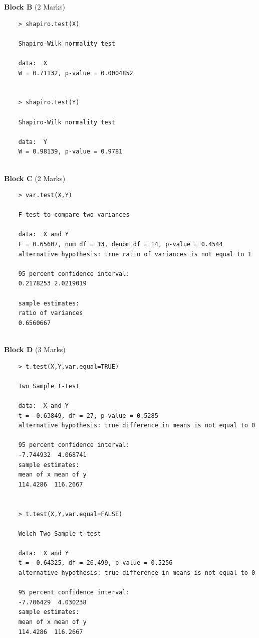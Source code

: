 \documentclass[a4paper,12pt]{article}
\begin{document}
\begin{framed}
	\noindent 	\textbf{Block B} (2 Marks)
	\begin{verbatim}
	> shapiro.test(X)
	
	Shapiro-Wilk normality test
	
	data:  X
	W = 0.71132, p-value = 0.0004852
	
	
	> shapiro.test(Y)
	
	Shapiro-Wilk normality test
	
	data:  Y
	W = 0.98139, p-value = 0.9781
	
	\end{verbatim}
\end{framed}

\begin{framed}
	\noindent 	\textbf{Block C} (2 Marks)
	\begin{verbatim}
	> var.test(X,Y)
	
	F test to compare two variances
	
	data:  X and Y
	F = 0.65607, num df = 13, denom df = 14, p-value = 0.4544
	alternative hypothesis: true ratio of variances is not equal to 1
	
	95 percent confidence interval:
	0.2178253 2.0219019
	
	sample estimates:
	ratio of variances 
	0.6560667
	
	\end{verbatim}
\end{framed}
\newpage
\begin{framed}
	\noindent \textbf{Block D} (3 Marks)
	\begin{verbatim}
	> t.test(X,Y,var.equal=TRUE)
	
	Two Sample t-test
	
	data:  X and Y
	t = -0.63849, df = 27, p-value = 0.5285
	alternative hypothesis: true difference in means is not equal to 0
	
	95 percent confidence interval:
	-7.744932  4.068741
	sample estimates:
	mean of x mean of y 
	114.4286  116.2667 
	
	
	> t.test(X,Y,var.equal=FALSE)
	
	Welch Two Sample t-test
	
	data:  X and Y
	t = -0.64325, df = 26.499, p-value = 0.5256
	alternative hypothesis: true difference in means is not equal to 0
	
	95 percent confidence interval:
	-7.706429  4.030238
	sample estimates:
	mean of x mean of y 
	114.4286  116.2667 
	
	\end{verbatim}
\end{framed}
\newpage
\end{document}
